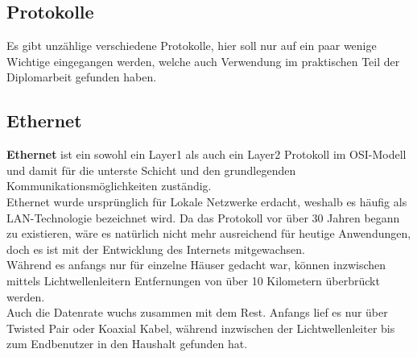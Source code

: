 \documentclass[12pt,a4paper]{report}
\begin{document}
\begin{onehalfspace}
\section{Protokolle}
Es gibt unzählige verschiedene Protokolle, hier soll nur auf ein paar wenige Wichtige eingegangen werden, welche auch Verwendung im praktischen Teil der Diplomarbeit gefunden haben.
\subsection{Ethernet}\label{ssec:eth}
\textbf{Ethernet} ist ein sowohl ein Layer1 als auch ein Layer2 Protokoll im OSI-Modell und damit für die unterste Schicht und den grundlegenden Kommunikationsmöglichkeiten zuständig.\\

Ethernet wurde ursprünglich für Lokale Netzwerke erdacht, weshalb es häufig als LAN-Technologie bezeichnet wird. Da das Protokoll vor über 30 Jahren begann zu existieren, wäre es natürlich nicht mehr ausreichend für heutige Anwendungen, doch es ist mit der Entwicklung des Internets mitgewachsen.\\
Während es anfangs nur für einzelne Häuser gedacht war, können inzwischen mittels Lichtwellenleitern Entfernungen von über 10 Kilometern überbrückt werden.\\

Auch die Datenrate wuchs zusammen mit dem Rest. Anfangs lief es nur über Twisted Pair oder Koaxial Kabel, während inzwischen der Lichtwellenleiter bis zum Endbenutzer in den Haushalt gefunden hat.\\


\end{onehalfspace}
\end{document}

